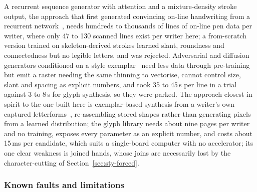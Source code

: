 A recurrent sequence generator with attention and a mixture-density stroke output, the approach that first generated convincing on-line handwriting from a recurrent network~\cite[p.~1]{graves2013}, needs hundreds to thousands of lines of on-line pen data per writer, where only 47 to 130 scanned lines exist per writer here; a from-scratch version trained on skeleton-derived strokes learned slant, roundness and connectedness but no legible letters, and was rejected. Adversarial and diffusion generators conditioned on a style exemplar~\cite{kang2020,dai2024} need less data through pre-training but emit a raster needing the same thinning to vectorise, cannot control size, slant and spacing as explicit numbers, and took 35 to 45\,s per line in a trial against 3 to 8\,s for glyph synthesis, so they were parked. The approach closest in spirit to the one built here is exemplar-based synthesis from a writer's own captured letterforms~\cite[p.~26:1]{haines2016}, re-assembling stored shapes rather than generating pixels from a learned distribution; the glyph library needs about nine pages per writer and no training, exposes every parameter as an explicit number, and costs about 15\,ms per candidate, which suits a single-board computer with no accelerator; its one clear weakness is joined hands, whose joins are necessarily lost by the character-cutting of Section~\ref{sec:sty-forced}.

\subsubsection{Known faults and limitations}
\label{sec:syn-limits}

